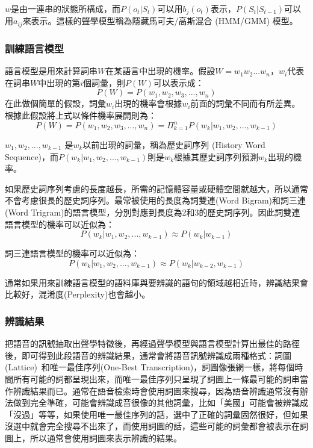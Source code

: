     $w$是由一連串的狀態所構成，而$P(o_t|S_t)$可以用$b_j(o_t)$表示，$P(S_t|S_{t-1})$可以用$a_{ij}$來表示。這樣的聲學模型稱為隱藏馬可夫/高斯混合 (HMM/GMM) 模型。

\subsubsection{訓練語言模型}
語言模型是用來計算詞串$W$在某語言中出現的機率。假設$W = {w_1w_2...w_n}$，$w_i$代表在詞串$W$中出現的第$i$個詞彙，則$P(W)$可以表示成：
    \begin{equation}
        P(W) = P(w_1,w_2,w_3,...,w_n)
    \end{equation}
在此做個簡單的假設，詞彙$w_i$出現的機率會根據$w_i$前面的詞彙不同而有所差異。根據此假設將上式以條件機率展開則為：
    \begin{equation}
    P(W) = P(w_1, w_2, w_3,..., w_n) = \Pi^n_{k=1}P(w_k|w_1,w_2,...,w_{k-1}) 
    \end{equation}

    $w_1, w_2, ..., w_{k-1}$ 是$w_k$以前出現的詞彙，稱為歷史詞序列 (History Word Sequence)，而$P(w_k| w_1, w_2, ..., w_{k-1})$則是$w_k$根據其歷史詞序列預測$w_k$出現的機率。

    如果歷史詞序列考慮的長度越長，所需的記憶體容量或硬體空間就越大，所以通常不會考慮很長的歷史詞序列。最常被使用的長度為詞雙連(Word Bigram)和詞三連(Word Trigram)的語言模型，分別對應到長度為2和3的歷史詞序列。因此詞雙連語言模型的機率可以近似為：
    \begin{equation}
    P(w_k|w_1, w_2, ..., w_{k-1}) \approx P(w_k|w_{k-1})
    \end{equation}

詞三連語言模型的機率可以近似為：
    \begin{equation}
    P(w_k|w_1, w_2, ..., w_{k-1}) \approx P(w_k|w_{k-2}, w_{k-1})
    \end{equation}

通常如果用來訓練語言模型的語料庫與要辨識的語句的領域越相近時，辨識結果會比較好，混淆度(Perplexity)也會越小。

\subsubsection{辨識結果}
把語音的訊號抽取出聲學特徵後，再經過聲學模型與語言模型計算出最佳的路徑後，即可得到此段語音的辨識結果，通常會將語音訊號辨識成兩種格式：詞圖(Lattice)~\cite{saraclar51lattice}和唯一最佳序列(One-Best
Transcription)，詞圖像張網一樣，將每個時間所有可能的詞都呈現出來，而唯一最佳序列只呈現了詞圖上一條最可能的詞串當作辨識結果而已。通常在語音檢索時會使用詞圖來搜尋，因為語音辨識通常沒有辦法做到完全準確，可能會辨識成音很像的其他詞彙，比如「美國」可能會被辨識成「沒過」等等，如果使用唯一最佳序列的話，選中了正確的詞彙固然很好，但如果沒選中就會完全搜尋不出來了，而使用詞圖的話，這些可能的詞彙都會被表示在詞圖上，所以通常會使用詞圖來表示辨識的結果。

